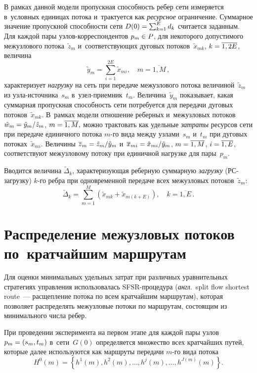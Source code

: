 \begin{multicols}{2}
В рамках данной модели про\-пуск\-ная спо\-соб\-ность ребер сети измеряется в~условных 
единицах потока и~трак\-ту\-ет\-ся как \textit{ресурсное} огра\-ни\-че\-ние. Суммарное значение 
про\-пуск\-ной спо\-соб\-ности сети
$ D(0) \hm= \sum\nolimits_{k=1}^{E} d_k$ считается заданным.
Для каждой пары уз\-лов-кор\-рес\-пон\-ден\-тов $p_m \hm\in P$, для некоторого до\-пус\-ти\-мо\-го 
межузлового потока~$\tilde{z}_m$ и~со\-от\-вет\-ст\-ву\-ющих дуговых потоков~$\tilde{x}_{mk}$, 
 $k \hm= \overline{1, 2E}$, ве\-ли\-чина
$$
\tilde{y}_m = \sum\limits_{i=1}^{2E} \tilde{x}_{mi}, \quad m = \overline{1, M}\,,
$$
характеризует \textit{нагрузку} на сеть  при передаче  межузлового потока величиной~$\tilde{z}_m$ 
из уз\-ла-ис\-точ\-ни\-ка~$s_m$  в~узел-при\-ем\-ник~$t_m$. 
Величина~$\tilde{y}_m$ показывает, какая суммарная про\-пуск\-ная спо\-соб\-ность сети 
по\-тре\-бу\-ет\-ся для передачи дуговых потоков~$\tilde{x}_{mk}$. В~рамках модели 
отношение реберных и~межузловых потоков
$ \tilde{w}_m \hm= {\tilde{y}_m}/{\tilde{z}_m}$,  $m \hm= \overline{1, M},$
мож\-но трак\-то\-вать как удельные \textit{затраты}  ресурсов сети при передаче 
единичного   потока $m$-го вида меж\-ду узлами~$s_m$ и~$t_m$ при  дуговых потоках~$\tilde{x}_{mi}$.
Величины $\overline {z}_m \hm= \tilde{z}_m/\tilde{y}_m$ и~$\overline{x}_{mi} \hm= \tilde{x}_{mi}/ \tilde{y}_m$, 
 $m \hm= \overline{1, M}$,  $i \hm= \overline{1, E}$, соответствуют межузловому 
потоку при единичной на\-груз\-ке для пары~$p_m$.

Вводится величина $\tilde{\Delta}_k$, ха\-рак\-те\-ри\-зу\-ющая ре\-бер\-ную суммарную 
\textit{загрузку} (РС-за\-груз\-ку) $k$-го ребра при одновременной передаче всех межузловых 
потоков~$\tilde{z}_m$:
$$
\tilde{\Delta}_k = \sum\limits_{m=1}^{M} \left(\tilde{x}_{mk}+ \tilde{x}_{m(k+E)}\right),  \quad  k =\overline{1, E}\,.  
$$

\section{Распределение межузловых потоков по~кратчайшим маршрутам}

Для оценки минимальных удельных затрат при различных урав\-ни\-тель\-ных стратегиях 
управ\-ле\-ния использовалась SFSR-про\-це\-ду\-ра (\textit{англ}.\ split flow shortest 
route~--- рас\-щеп\-ле\-ние потока по всем крат\-чай\-шим маршрутам), которая
поз\-во\-ля\-ет распределять межузловые потоки по марш\-ру\-там, со\-сто\-ящим из минимального 
чис\-ла ре\-бер.

При проведении эксперимента на пер\-вом этапе для каж\-дой пары узлов $p_m \hm= (s_m, t_m)$ в~сети~$G(0)$ 
определяется множество всех крат\-чай\-ших путей, которые далее 
используются как марш\-ру\-ты передачи $m$-го вида потока
$$
H^0(m) = \left\{ h^1(m), h^2(m), \ldots, h^j(m), \ldots, h^{J(m)}(m)\right\}\!.
$$ 


\end{multicols}
